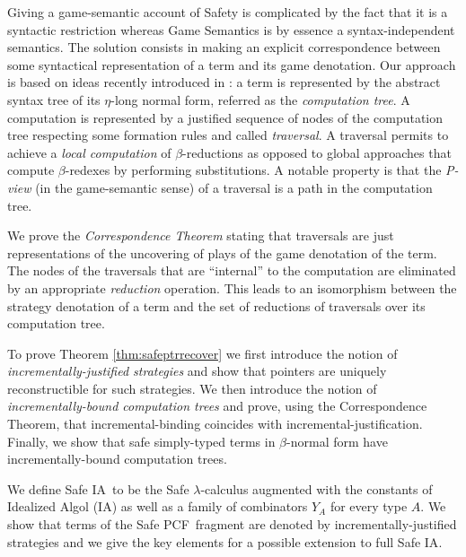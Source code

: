 \documentclass{ouclprgsc}
\newcommand\ialgol{\textsf{IA}}
\newcommand\pcf{\textsf{PCF}}
\begin{document}
Giving a game-semantic account of Safety is complicated by the fact
that it is a syntactic restriction whereas Game Semantics is by
essence a syntax-independent semantics. The solution consists in
making an explicit correspondence between some syntactical
representation of a term and its game denotation. Our approach is
based on ideas recently introduced in \cite{OngLics2006}: a term is
represented by the abstract syntax tree of its $\eta$-long normal
form, referred as the \emph{computation tree}. A computation is
represented by a justified sequence of nodes of the computation tree
respecting some formation rules and called \emph{traversal}. A
traversal permits to achieve a \emph{local computation} of
$\beta$-reductions as opposed to global approaches that compute
$\beta$-redexes by performing substitutions. A notable property is
that the \emph{P-view} (in the game-semantic sense) of a traversal
is a path in the computation tree.

We prove the \emph{Correspondence Theorem} stating that traversals
are just representations of the uncovering of plays of the game
denotation of the term. The nodes of the traversals that are
``internal'' to the computation are eliminated by an appropriate
\emph{reduction} operation. This leads to an isomorphism between the
strategy denotation of a term and the set of reductions of
traversals over its computation tree.

To prove Theorem \ref{thm:safeptrrecover} we first introduce the
notion of \emph{incrementally-justified strategies} and show that
pointers are uniquely reconstructible for such strategies. We then
introduce the notion of \emph{incrementally-bound computation trees}
and prove, using the Correspondence Theorem, that
incremental-binding coincides with incremental-justification.
Finally, we show that safe simply-typed terms in $\beta$-normal form
have incrementally-bound computation trees.

We define Safe \ialgol\ to be the Safe $\lambda$-calculus augmented
with the constants of Idealized Algol (\ialgol) as well as a family
of combinators $Y_A$ for every type $A$. We show that terms of the
Safe \pcf\ fragment are denoted by incrementally-justified
strategies and we give the key elements for a possible extension to
full Safe \ialgol.



\end{document}
